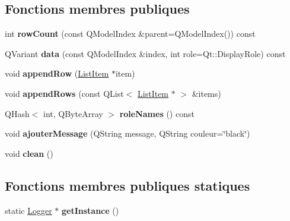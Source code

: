 \subsection*{Fonctions membres publiques}
\begin{DoxyCompactItemize}
\item 
int {\bfseries row\+Count} (const Q\+Model\+Index \&parent=Q\+Model\+Index()) const \hypertarget{class_logger_a18c49d472888e90cf665bf94a05e7f7b}{}\label{class_logger_a18c49d472888e90cf665bf94a05e7f7b}

\item 
Q\+Variant {\bfseries data} (const Q\+Model\+Index \&index, int role=Qt\+::\+Display\+Role) const \hypertarget{class_logger_ae958be03d479d1cd0f8965844dddb741}{}\label{class_logger_ae958be03d479d1cd0f8965844dddb741}

\item 
void {\bfseries append\+Row} (\hyperlink{class_list_item}{List\+Item} $\ast$item)\hypertarget{class_logger_a6e93ce928f16dd70a97253a009e680a4}{}\label{class_logger_a6e93ce928f16dd70a97253a009e680a4}

\item 
void {\bfseries append\+Rows} (const Q\+List$<$ \hyperlink{class_list_item}{List\+Item} $\ast$ $>$ \&items)\hypertarget{class_logger_addccef2b72456c7d6183f8b3a3afba25}{}\label{class_logger_addccef2b72456c7d6183f8b3a3afba25}

\item 
Q\+Hash$<$ int, Q\+Byte\+Array $>$ {\bfseries role\+Names} () const \hypertarget{class_logger_ae8e97121859692993d50e9465a3f5db6}{}\label{class_logger_ae8e97121859692993d50e9465a3f5db6}

\item 
void {\bfseries ajouter\+Message} (Q\+String message, Q\+String couleur=\char`\"{}black\char`\"{})\hypertarget{class_logger_aedcf172c2590410f42225de83bf39bf9}{}\label{class_logger_aedcf172c2590410f42225de83bf39bf9}

\item 
void {\bfseries clean} ()\hypertarget{class_logger_a2aabe28b224b55fbf6d7432785cf6d2e}{}\label{class_logger_a2aabe28b224b55fbf6d7432785cf6d2e}

\end{DoxyCompactItemize}
\subsection*{Fonctions membres publiques statiques}
\begin{DoxyCompactItemize}
\item 
static \hyperlink{class_logger}{Logger} $\ast$ {\bfseries get\+Instance} ()\hypertarget{class_logger_afec28ae6d7bdf8f6a0734cb20756de10}{}\label{class_logger_afec28ae6d7bdf8f6a0734cb20756de10}

\end{DoxyCompactItemize}
